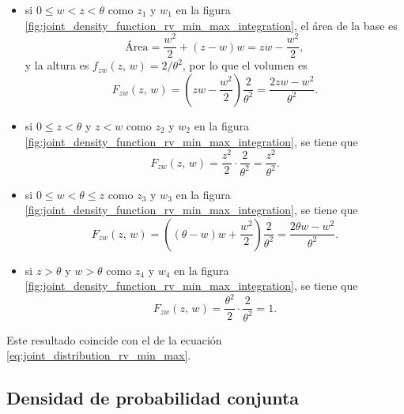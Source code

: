 \documentclass[a4paper]{report}
\begin{document}
\begin{itemize}
 \item si \(0\leq w<z<\theta\) como \(z_1\) y \(w_1\) en la figura \ref{fig:joint_density_function_rv_min_max_integration}, el área de la base es
 \[
  \textrm{Área}=\frac{w^2}{2}+(z-w)w=zw-\frac{w^2}{2},
 \]
y la altura es \(f_{zw}(z,\,w)=2/\theta^2\), por lo que el volumen es
\[
 F_{zw}(z,\,w)=\left(zw-\frac{w^2}{2}\right)\frac{2}{\theta^2}=\frac{2zw-w^2}{\theta^2}.
\]
\item si \(0\leq z<\theta\) y \(z<w\) como \(z_2\) y \(w_2\) en la figura \ref{fig:joint_density_function_rv_min_max_integration}, se tiene que
\[
 F_{zw}(z,\,w)=\frac{z^2}{2}\cdot\frac{2}{\theta^2}=\frac{z^2}{\theta^2}.
\]
\item si \(0\leq w<\theta\leq z\) como \(z_3\) y \(w_3\) en la figura \ref{fig:joint_density_function_rv_min_max_integration}, se tiene que
\[
 F_{zw}(z,\,w)=\left((\theta-w)w+\frac{w^2}{2}\right)\frac{2}{\theta^2}=\frac{2\theta w-w^2}{\theta^2}.
\]
\item si \(z>\theta\) y \(w>\theta\) como \(z_4\) y \(w_4\) en la figura \ref{fig:joint_density_function_rv_min_max_integration}, se tiene que
\[
 F_{zw}(z,\,w)=\frac{\theta^2}{2}\cdot\frac{2}{\theta^2}=1.
\]
\end{itemize}
Este resultado coincide con el de la ecuación \ref{eq:joint_distribution_rv_min_max}.

\subsection{Densidad de probabilidad conjunta}\label{sec:two_funcions_of_two_rv_joint_density}
\end{document}
